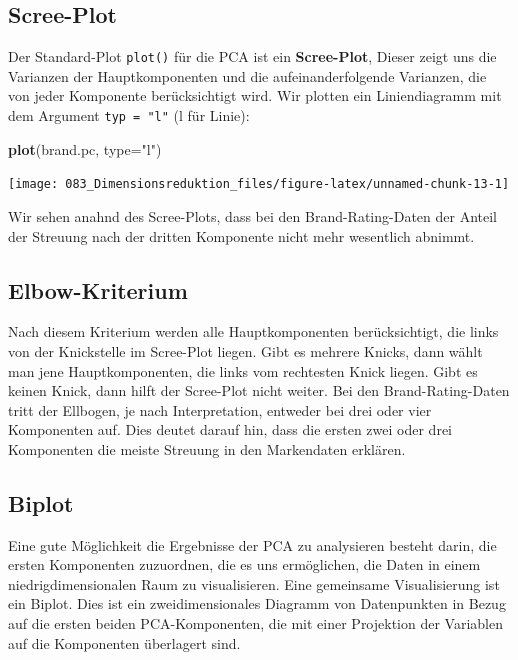 \documentclass[12pt,]{book}
\makeatletter
\newenvironment{Shaded}{\begin{snugshade}}{\end{snugshade}}
\newcommand{\KeywordTok}[1]{\textcolor[rgb]{0.13,0.29,0.53}{\textbf{{#1}}}}
\newcommand{\DataTypeTok}[1]{\textcolor[rgb]{0.13,0.29,0.53}{{#1}}}
\newcommand{\StringTok}[1]{\textcolor[rgb]{0.31,0.60,0.02}{{#1}}}
\newcommand{\NormalTok}[1]{{#1}}
\newenvironment{kframe}{%
\medskip{}
\setlength{\fboxsep}{.8em}
 \def\at@end@of@kframe{}%
 \ifinner\ifhmode%
  \def\at@end@of@kframe{\end{minipage}}%
  \begin{minipage}{\columnwidth}%
 \fi\fi%
 \def\FrameCommand##1{\hskip\@totalleftmargin \hskip-\fboxsep
 \colorbox{shadecolor}{##1}\hskip-\fboxsep
     \hskip-\linewidth \hskip-\@totalleftmargin \hskip\columnwidth}%
 \MakeFramed {\advance\hsize-\width
   \@totalleftmargin\z@ \linewidth\hsize
   \@setminipage}}%
 {\par\unskip\endMakeFramed%
 \at@end@of@kframe}
\renewenvironment{Shaded}{\begin{kframe}}{\end{kframe}}
\makeatother
\begin{document}
\subsection{Scree-Plot}\label{scree-plot}

Der Standard-Plot \texttt{plot()} für die PCA ist ein
\textbf{Scree-Plot}, Dieser zeigt uns die Varianzen der Hauptkomponenten
und die aufeinanderfolgende Varianzen, die von jeder Komponente
berücksichtigt wird. Wir plotten ein Liniendiagramm mit dem Argument
\texttt{typ\ =\ "l"} (l für Linie):

\begin{Shaded}
\begin{Highlighting}[]
\KeywordTok{plot}\NormalTok{(brand.pc, }\DataTypeTok{type=}\StringTok{"l"}\NormalTok{)}
\end{Highlighting}
\end{Shaded}

\begin{center}\texttt{[image: 083\_Dimensionsreduktion\_files/figure-latex/unnamed-chunk-13-1]} \end{center}

Wir sehen anahnd des Scree-Plots, dass bei den Brand-Rating-Daten der
Anteil der Streuung nach der dritten Komponente nicht mehr wesentlich
abnimmt.

\subsection{Elbow-Kriterium}\label{elbow-kriterium}

Nach diesem Kriterium werden alle Hauptkomponenten berücksichtigt, die
links von der Knickstelle im Scree-Plot liegen. Gibt es mehrere Knicks,
dann wählt man jene Hauptkomponenten, die links vom rechtesten Knick
liegen. Gibt es keinen Knick, dann hilft der Scree-Plot nicht weiter.
Bei den Brand-Rating-Daten tritt der Ellbogen, je nach Interpretation,
entweder bei drei oder vier Komponenten auf. Dies deutet darauf hin,
dass die ersten zwei oder drei Komponenten die meiste Streuung in den
Markendaten erklären.

\subsection{Biplot}\label{biplot}

Eine gute Möglichkeit die Ergebnisse der PCA zu analysieren besteht
darin, die ersten Komponenten zuzuordnen, die es uns ermöglichen, die
Daten in einem niedrigdimensionalen Raum zu visualisieren. Eine
gemeinsame Visualisierung ist ein Biplot. Dies ist ein zweidimensionales
Diagramm von Datenpunkten in Bezug auf die ersten beiden
PCA-Komponenten, die mit einer Projektion der Variablen auf die
Komponenten überlagert sind.
\end{document}

